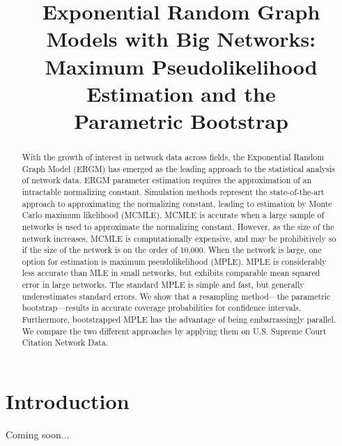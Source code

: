 \documentclass[headsepline=true, abstracton]{scrartcl}
\begin{document}
\setcounter{section}{-1}

\renewcommand{\refname}{Bibliography}


\onehalfspacing
\setlength{\headsep}{15mm}


\thispagestyle{plain}

\title{\Large Exponential Random Graph Models with Big Networks: Maximum Pseudolikelihood Estimation and the\\Parametric Bootstrap}
\maketitle

\begin{abstract}
\noindent With the growth of interest in network data across fields, the Exponential Random Graph Model (ERGM) has emerged as the leading approach to the statistical analysis of network data. ERGM parameter estimation requires the approximation of an intractable normalizing constant. Simulation methods represent the state-of-the-art approach to approximating the normalizing constant, leading to estimation by Monte Carlo maximum likelihood (MCMLE). MCMLE is accurate when a large sample of networks is used to approximate the normalizing constant. However, as the size of the network increases, MCMLE is computationally expensive, and may be prohibitively so if the size of the network is on the order of 10,000. When the network is large, one option for estimation is maximum pseudolikelihood (MPLE). MPLE is considerably less accurate than MLE in small networks, but exhibits comparable mean squared error in large networks. The standard MPLE is simple and fast, but generally underestimates standard errors. We show that a resampling method---the parametric bootstrap---results in accurate coverage probabilities for confidence intervals. Furthermore, bootstrapped MPLE has the advantage of being embarrassingly parallel. We compare the two different approaches by applying them on U.S. Supreme Court Citation Network Data.
\end{abstract}


 \section*{Introduction}
 
 Coming soon...
 
\end{document}
